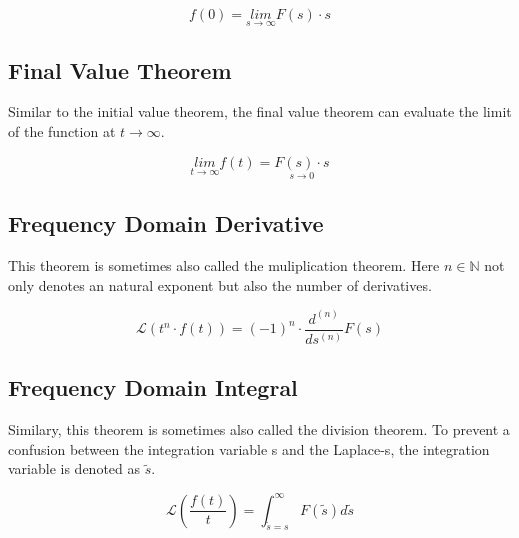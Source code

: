 \documentclass[./\jobname.tex]{subfiles}
\begin{document}
\begin{equation}
	f(0) = \underset{s \rightarrow \infty}{lim} F(s) \cdot s
\end{equation}

\subsection{Final Value Theorem}

Similar to the initial value theorem, the final value theorem can evaluate the limit of the function at $t \rightarrow \infty$. 

\begin{equation}
	\underset{t \rightarrow \infty}{lim} f(t) = \underset{s \rightarrow 0}{F(s) \cdot s}
\end{equation}

\subsection{Frequency Domain Derivative}
This theorem is sometimes also called the muliplication theorem. Here $n \in \mathbb{N}$ not only denotes an natural exponent but also the number of derivatives. 

\begin{equation}
	\mathcal{L} \left( t^n \cdot f(t) \right) = (-1)^n \cdot \frac{d^{(n)}}{ds^{(n)}} F(s)
\end{equation}


\subsection{Frequency Domain Integral}

Similary, this theorem is sometimes also called the division theorem. To prevent a confusion between the integration variable s and the Laplace-s, the integration variable is denoted as $\tilde{s}$.

\begin{equation}
\mathcal{L} \left(\frac{f(t)}{t}\right) = \int_{\tilde{s} = s}^{\infty} F(\tilde{s}) d\tilde{s}
\end{equation}

\newpage
\end{document}

